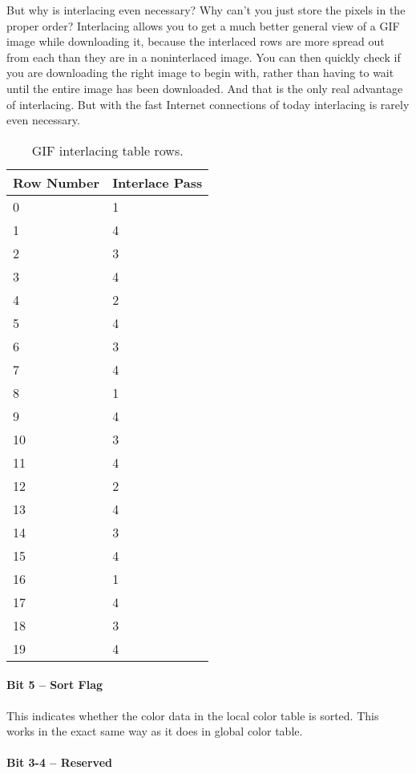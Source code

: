 But why is interlacing even necessary? Why can't you just store the
pixels in the proper order? Interlacing allows you to get a much
better general view of a GIF image while downloading it, because the
interlaced rows are more spread out from each than they are in a
noninterlaced image. You can then quickly check if you are downloading
the right image to begin with, rather than having to wait until the
entire image has been downloaded. And that is the only real advantage
of interlacing. But with the fast Internet connections of today
interlacing is rarely even necessary.


\begin{table}
  \centering
  \begin{tabular}{ll}
    \toprule
    Row Number & Interlace Pass \\
    \midrule
    0 & 1 \\
    1 & 4 \\
    2 & 3 \\
    3 & 4 \\
    4 & 2 \\
    5 & 4 \\
    6 & 3 \\
    7 & 4 \\
    8 & 1 \\
    9 & 4 \\
    10 & 3 \\
    11 & 4 \\
    12 & 2 \\
    13 & 4 \\
    14 & 3 \\
    15 & 4 \\
    16 & 1 \\
    17 & 4 \\
    18 & 3 \\
    19 & 4 \\
    \bottomrule
  \end{tabular}
  \caption{GIF interlacing table rows.}
  \label{tab:gif-interlacing}
\end{table}

\paragraph{Bit 5 -- Sort Flag}

This indicates whether the color data in the local color table is
sorted. This works in the exact same way as it does in global color
table.

\paragraph{Bit 3-4 -- Reserved}

